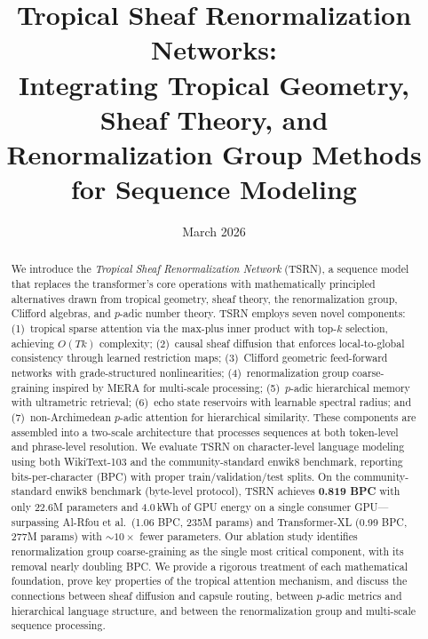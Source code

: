 \documentclass[11pt,a4paper]{article}
\title{%
  \textbf{Tropical Sheaf Renormalization Networks:}\\[4pt]
  \large Integrating Tropical Geometry, Sheaf Theory, and\\
  Renormalization Group Methods for Sequence Modeling%
}
\author{%
}
\date{March 2026}
\begin{document}
\maketitle

\begin{abstract}
We introduce the \emph{Tropical Sheaf Renormalization Network} (TSRN),
a sequence model that replaces the transformer's core operations with
mathematically principled alternatives drawn from tropical geometry,
sheaf theory, the renormalization group, Clifford algebras, and $p$-adic
number theory.  TSRN employs seven novel components: (1)~tropical sparse
attention via the max-plus inner product with top-$k$ selection,
achieving $O(Tk)$ complexity; (2)~causal sheaf diffusion that enforces
local-to-global consistency through learned restriction maps;
(3)~Clifford geometric feed-forward networks with grade-structured
nonlinearities; (4)~renormalization group coarse-graining inspired by
MERA for multi-scale processing; (5)~$p$-adic hierarchical memory with
ultrametric retrieval; (6)~echo state reservoirs with learnable spectral
radius; and (7)~non-Archimedean $p$-adic attention for hierarchical
similarity.  These components are assembled into a two-scale architecture
that processes sequences at both token-level and phrase-level resolution.
We evaluate TSRN on character-level language modeling using both
WikiText-103 and the community-standard enwik8 benchmark, reporting
bits-per-character (BPC) with proper train/validation/test splits.
On the community-standard enwik8 benchmark (byte-level protocol),
TSRN achieves \textbf{0.819 BPC} with only 22.6M parameters and
4.0\,kWh of GPU energy on a single consumer GPU---surpassing
Al-Rfou et al.\ (1.06 BPC, 235M params) and Transformer-XL
(0.99 BPC, 277M params) with $\sim\!10\times$ fewer parameters.
Our ablation study identifies
renormalization group coarse-graining as the single most critical
component, with its removal nearly doubling BPC.  We provide a rigorous treatment of each
mathematical foundation, prove key properties of the tropical attention
mechanism, and discuss the connections between sheaf diffusion and
capsule routing, between $p$-adic metrics and hierarchical language
structure, and between the renormalization group and multi-scale
sequence processing.
\end{abstract}

\end{document}
